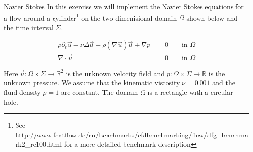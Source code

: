 \documentclass[12pt,a4paper]{article}
\newcommand{\Laplace}{\Delta}
\begin{document}
\begin{Exercise}{Navier Stokes}
  In this exercise we will implement the Navier Stokes equations for a flow
  around a cylinder\footnote{See
    http://www.featflow.de/en/benchmarks/cfdbenchmarking/flow/dfg\_benchmark2\_re100.html
    for a more detailed benchmark description} on the two dimenisional domain
  $\Omega$ shown below and the time interval $\Sigma$.

  \begin{equation}
    \begin{aligned}
      \rho \partial_t \vec{u} - \nu \Laplace \vec{u} + \rho (\nabla \vec{u}) \vec{u} + \nabla p &= 0 \qquad \text{in $\Omega$}\\
      \nabla \cdot \vec{u} &= 0 \qquad \text{in $\Omega$}
    \end{aligned}
    \label{eq:navier-stokes}
  \end{equation}

  Here $\vec{u}:\Omega\times\Sigma\to\mathbb{R}^2$ is the unknown velocity
  field and $p:\Omega\times\Sigma\to\mathbb{R}$ is the unknown pressure. We
  assume that the kinematic viscosity $\nu=0.001$ and the fluid density
  $\rho=1$ are constant. The domain $\Omega$ is a rectangle with a circular
  hole.

  \begin{center}
  \end{center}


\end{Exercise}
\end{document}
